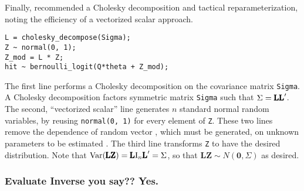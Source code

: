 Finally, \cite{Carpenter} recommended a Cholesky decomposition and tactical reparameterization, noting the efficiency of a vectorized scalar approach.
\begin{verbatim}
L = cholesky_decompose(Sigma);  
Z ~ normal(0, 1);  
Z_mod = L * Z; 
hit ~ bernoulli_logit(Q*theta + Z_mod);
\end{verbatim}
The first line performs a Cholesky decomposition on the covariance matrix \verb|Sigma|. A Cholesky decomposition factors symmetric matrix \verb|Sigma| such that $\Sigma = \text{\pmb{LL}}'$. The second, ``vectorized scalar'' line generates $n$ standard normal random variables, by reusing \verb|normal(0, 1)| for every element of \verb|Z|. These two lines remove the dependence of random vector , which must be generated, on unknown parameters to be estimated \cite{Trangucci2017}. The third line transforms \verb|Z| to have the desired distribution. Note that $\text{Var}(\text{\pmb{LZ}}) = \text{\pmb{L}} \text{I}_{n}\text{\pmb{L}}' = \Sigma$, so that $\pmb{LZ} \sim N(\pmb{0}, \Sigma)$ as desired.


\subsubsection*{Evaluate Inverse you say?? Yes.}


